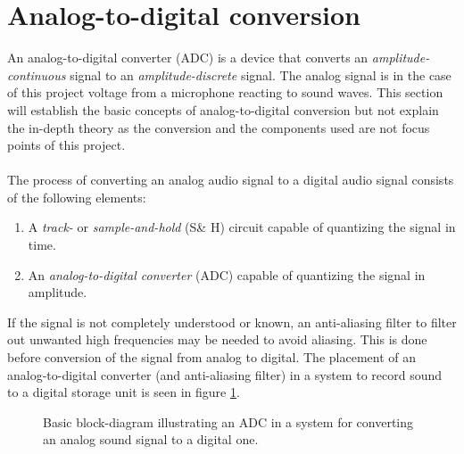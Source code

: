 \section{Analog-to-digital conversion} \label{ADC}
An analog-to-digital converter (ADC) is a device that converts an \textit{amplitude-continuous} signal to an \textit{amplitude-discrete} signal.  The analog signal is in the case of this project voltage from a microphone reacting to sound waves. This section will establish the basic concepts of analog-to-digital conversion but not explain the in-depth theory as the conversion and the components used are not focus points of this project.
\\ \\
The process of converting an analog audio signal to a digital audio signal consists of the following elements:
\begin{enumerate}
\item A \textit{track-} or \textit{sample-and-hold} (S\& H) circuit capable of quantizing the signal in time.
\item An \textit{analog-to-digital converter} (ADC) capable of quantizing the signal in amplitude.
\end{enumerate}
If the signal is not completely understood or known, an anti-aliasing filter to filter out unwanted high frequencies may be needed to avoid aliasing. This is done before conversion of the signal from analog to digital. The placement of an analog-to-digital converter (and anti-aliasing filter) in a system to record sound to a digital storage unit is seen in figure \ref{fig:input}.
\begin{figure}[H]
\centering
{}
\caption{Basic block-diagram illustrating an ADC in a system for converting an analog sound signal to a digital one.} 
\label{fig:input}
\end{figure}
%

